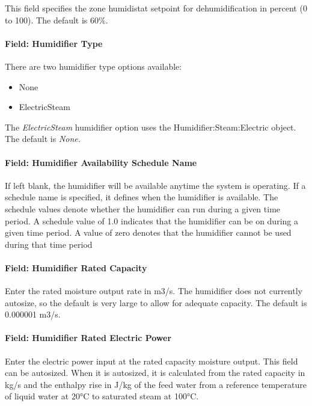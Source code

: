 This field specifies the zone humidistat setpoint for dehumidification in percent (0 to 100). The default is 60\%.

\paragraph{Field: Humidifier Type}\label{field-humidifier-type}

There are two humidifier type options available:

\begin{itemize}
\item
  None
\item
  ElectricSteam
\end{itemize}

The \emph{ElectricSteam} humidifier option uses the Humidifier:Steam:Electric object. The default is \emph{None.}

\paragraph{Field: Humidifier Availability Schedule Name}\label{field-humidifier-availability-schedule-name}

If left blank, the humidifier will be available anytime the system is operating. If a schedule name is specified, it defines when the humidifier is available. The schedule values denote whether the humidifier can run during a given time period. A schedule value of 1.0 indicates that the humidifier can be on during a given time period. A value of zero denotes that the humidifier cannot be used during that time period

\paragraph{Field: Humidifier Rated Capacity}\label{field-humidifier-rated-capacity}

Enter the rated moisture output rate in m3/s. The humidifier does not currently autosize, so the default is very large to allow for adequate capacity. The default is 0.000001 m3/s.

\paragraph{Field: Humidifier Rated Electric Power}\label{field-humidifier-rated-electric-power}

Enter the electric power input at the rated capacity moisture output. This field can be autosized. When it is autosized, it is calculated from the rated capacity in kg/s and the enthalpy rise in J/kg of the feed water from a reference temperature of liquid water at 20°C to saturated steam at 100°C.

